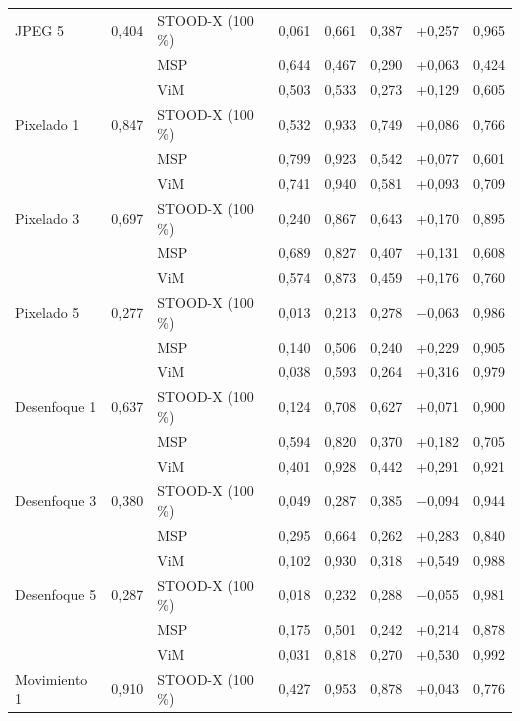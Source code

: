 {\begin{longtable}{lllccccc}
\addlinespace[2pt]
JPEG 5 & 0{,}404 & STOOD-X (100\,\%) & 0{,}061 & 0{,}661 & 0{,}387 & +0{,}257 & 0{,}965 \\
 &  & MSP & 0{,}644 & 0{,}467 & 0{,}290 & +0{,}063 & 0{,}424 \\
 &  & ViM & 0{,}503 & 0{,}533 & 0{,}273 & +0{,}129 & 0{,}605 \\
\addlinespace[2pt]
Pixelado 1 & 0{,}847 & STOOD-X (100\,\%) & 0{,}532 & 0{,}933 & 0{,}749 & +0{,}086 & 0{,}766 \\
 &  & MSP & 0{,}799 & 0{,}923 & 0{,}542 & +0{,}077 & 0{,}601 \\
 &  & ViM & 0{,}741 & 0{,}940 & 0{,}581 & +0{,}093 & 0{,}709 \\
\addlinespace[2pt]
Pixelado 3 & 0{,}697 & STOOD-X (100\,\%) & 0{,}240 & 0{,}867 & 0{,}643 & +0{,}170 & 0{,}895 \\
 &  & MSP & 0{,}689 & 0{,}827 & 0{,}407 & +0{,}131 & 0{,}608 \\
 &  & ViM & 0{,}574 & 0{,}873 & 0{,}459 & +0{,}176 & 0{,}760 \\
\addlinespace[2pt]
Pixelado 5 & 0{,}277 & STOOD-X (100\,\%) & 0{,}013 & 0{,}213 & 0{,}278 & $-$0{,}063 & 0{,}986 \\
 &  & MSP & 0{,}140 & 0{,}506 & 0{,}240 & +0{,}229 & 0{,}905 \\
 &  & ViM & 0{,}038 & 0{,}593 & 0{,}264 & +0{,}316 & 0{,}979 \\
\addlinespace[2pt]
Desenfoque 1 & 0{,}637 & STOOD-X (100\,\%) & 0{,}124 & 0{,}708 & 0{,}627 & +0{,}071 & 0{,}900 \\
 &  & MSP & 0{,}594 & 0{,}820 & 0{,}370 & +0{,}182 & 0{,}705 \\
 &  & ViM & 0{,}401 & 0{,}928 & 0{,}442 & +0{,}291 & 0{,}921 \\
\addlinespace[2pt]
Desenfoque 3 & 0{,}380 & STOOD-X (100\,\%) & 0{,}049 & 0{,}287 & 0{,}385 & $-$0{,}094 & 0{,}944 \\
 &  & MSP & 0{,}295 & 0{,}664 & 0{,}262 & +0{,}283 & 0{,}840 \\
 &  & ViM & 0{,}102 & 0{,}930 & 0{,}318 & +0{,}549 & 0{,}988 \\
\addlinespace[2pt]
Desenfoque 5 & 0{,}287 & STOOD-X (100\,\%) & 0{,}018 & 0{,}232 & 0{,}288 & $-$0{,}055 & 0{,}981 \\
 &  & MSP & 0{,}175 & 0{,}501 & 0{,}242 & +0{,}214 & 0{,}878 \\
 &  & ViM & 0{,}031 & 0{,}818 & 0{,}270 & +0{,}530 & 0{,}992 \\
\addlinespace[2pt]
Movimiento 1 & 0{,}910 & STOOD-X (100\,\%) & 0{,}427 & 0{,}953 & 0{,}878 & +0{,}043 & 0{,}776 \\

\end{longtable}}
